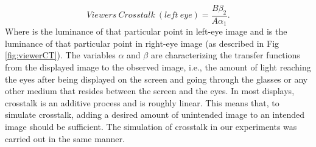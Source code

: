 \begin{equation}
Viewers\ Crosstalk\ (left\ eye) = \frac{B\beta_2}{A\alpha_1}.
\end{equation}
Where  is the luminance of that particular point in left-eye image and  is the luminance of that particular point in right-eye image (as described in Fig \ref{fig:viewerCT}). The variables \(\alpha\) and \(\beta\) are characterizing the transfer functions from the displayed image to the observed image, i.e., the amount of light reaching the eyes after being displayed on the screen and going through the glasses or any other medium that resides between the screen and the eyes. In most displays, crosstalk is an additive process and is roughly linear. This means that, to simulate crosstalk, adding a desired amount of unintended image to an intended image should be sufficient. The simulation of crosstalk in our experiments was carried out in the same manner.

